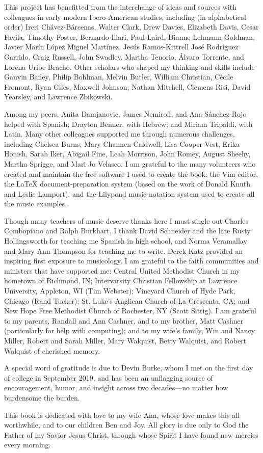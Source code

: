 This project has benefitted from the interchange of ideas and sources with
colleagues in early modern Ibero-American studies, including (in alphabetical
order)
Ireri Chávez-Bárcenas,
Walter Clark,
Drew Davies,
Elizabeth Davis,
Cesar Favila,
Timothy Foster,
Bernardo Illari,
Paul Laird,
Dianne Lehmann Goldman,
Javier Marín López
Miguel Martínez, 
Jesús Ramos-Kittrell
José Rodríguez Garrido, 
Craig Russell,
John Swadley,
Martha Tenorio, 
Álvaro Torrente,
and 
Lorena Uribe Bracho.
Other scholars who shaped my thinking and skills include 
Gauvin Bailey, 
Philip Bohlman, 
Melvin Butler, 
William Christian, 
Cécile Fromont, 
Ryan Giles, 
Maxwell Johnson, 
Nathan Mitchell,
Clemens Risi,
David Yearsley, 
and
Lawrence Zbikowski.

Among my peers, Anita Damjanovic, James Nemiroff, and Ana Sánchez-Rojo helped
with Spanish; Drayton Benner, with Hebrew; and Miriam Tripaldi, with Latin.
Many other colleagues supported me through numerous challenges,
including 
Chelsea Burns,
Mary Channen Caldwell,
Lisa Cooper-Vest,
Erika Honish, 
Sarah Iker,
Abigail Fine,
Leah Morrison,
John Romey,
August Sheehy, 
Martha Sprigge,
and
Mari Jo Velasco.
I am grateful to the many volunteers who created and maintain the free
software I used to create the book: the Vim editor, the \LaTeX{}
document-preparation system (based on the work of Donald Knuth and Leslie
Lamport), and the Lilypond music-notation system used to create all the music
examples.

Though many teachers of music deserve thanks here I must single out Charles
Combopiano and Ralph Burkhart.
I thank David Schneider and the late Rusty Hollingsworth for teaching me
Spanish in high school, and Norma Veramallay and Mary Ann Thompson for
teaching me to write.
Derek Katz provided an inspiring first exposure to musicology.
I am grateful to the faith communities and ministers that have supported me:
Central United Methodist Church in my hometown of Richmond, IN; Intervarsity
Christian Fellowship at Lawrence University, Appleton, WI (Tim Webster);
Vineyard Church of Hyde Park, Chicago (Rand Tucker); St. Luke's Anglican
Church of La Crescenta, CA; and New Hope Free Methodist Church of Rochester,
NY (Scott Sittig).
I am grateful to my parents, Randall and Ann Cashner, and to my brother, Matt
Cashner (particularly for help with computing); and to my wife's family, Win
and Nancy Miller, Robert and Sarah Miller, Mary Walquist, Betty Walquist,
and Robert Walquist of cherished memory.

A special word of gratitude is due to Devin Burke, whom I met on the first day
of college in September 2019, and has been an unflagging source of
encouragement, humor, and insight across two decades---no matter how
burdensome the burden.

This book is dedicated with love to my wife Ann, whose love makes this all
worthwhile, and to our children Ben and Joy.
All glory is due only to God the Father of my Savior Jesus Christ, through whose
Spirit I have found new mercies every morning.

\endinput
